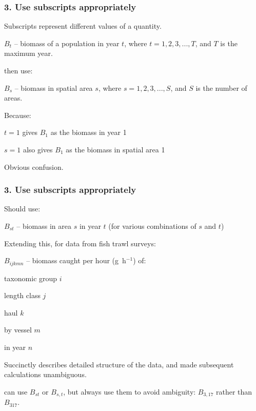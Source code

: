 
\begin{frame}
\frametitle{3. Use subscripts appropriately}

Subscripts represent different values of a quantity.

\bi
\item $B_t$ -- biomass of a population in year $t$, where
$t=1, 2, 3, ..., T$, and $T$ is the maximum year.
\ei

\pause

 then use:

\bi
\item $B_s$ -- biomass in spatial area $s$, where $s=1, 2, 3, ..., S$, and $S$
  is the number of areas.
  \ei

\pause

Because:

\bi
\item $t=1$ gives $B_1$ as the biomass in year 1

\item $s=1$ also gives $B_1$ as the biomass in spatial area 1
\ei

Obvious confusion.

\end{frame}


\begin{frame}
\frametitle{3. Use subscripts appropriately}

Should use:

\bi
\item $B_{st}$ -- biomass in area $s$ in year $t$ (for various combinations of $s$ and $t$)
\ei

\pause

Extending this, for data from fish trawl surveys:
\bi
  \item $B_{ijkmn}$ -- biomass caught per hour (g~h$^{-1}$) of:
  \bi
    \item taxonomic group $i$
    \item length class $j$
    \item haul $k$
    \item by vessel $m$
    \item in year $n$
  \ei
\ei

Succinctly describes detailed structure of the data, and made subsequent
calculations unambiguous.

\pause
\medskip

 can use $B_{st}$ or $B_{s,t}$, but always use them to avoid
ambiguity: $B_{3,17}$ rather than $B_{317}$.

\end{frame}

